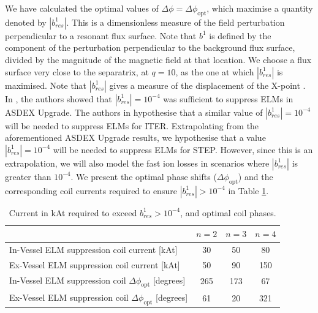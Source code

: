 \documentclass[10pt, a4paper, twoside]{article}
\begin{document}
We have calculated the optimal values of $\Delta \phi = \Delta\phi_\text{opt}$, which maximise a quantity denoted by $|b^1_{res}|$. This is a dimensionless measure of the field perturbation perpendicular to a resonant flux surface. 
Note that $b^1$ is defined by the component of the perturbation perpendicular to the background flux surface, divided by the magnitude of the magnetic field at that location.
We choose a flux surface very close to the separatrix, at $q=10$, as the one at which $|b^1_{res}|$ is maximised. 
Note that $|b^1_{res}|$ gives a measure of the displacement of the X-point \cite{ryan2017}. In \cite{suttrop2018}, the authors showed that $|b^1_{res}|=10^{-4}$ was sufficient to suppress ELMs in ASDEX Upgrade. The authors in \cite{liu2015} hypothesise that a similar value of $|b^1_{res}|=10^{-4}$ will be needed to suppress ELMs for ITER. Extrapolating from the aforementioned ASDEX Upgrade results, we hypothesise that a value $|b^1_{res}|=10^{-4}$ will be needed to suppress ELMs for STEP. However, since this is an extrapolation, we will also model the fast ion losses in scenarios where $|b^1_{res}|$ is greater than $10^{-4}$. We present the optimal phase shifts ($\Delta\phi_\text{opt}$) and the corresponding coil currents required to ensure $|b^1_{res}|>10^{-4}$ in Table \ref{table:optimum_currents_and_phases}. 
\begin{table}[htbp]
\centering
\begin{tabular}{lccc}
\hline
 & \( n=2 \) & \( n=3 \) & \( n=4 \) \\
\hline
In-Vessel ELM suppression coil current [kAt] & 30 & 50 & 80 \\
Ex-Vessel ELM suppression coil current [kAt] & 50 & 90 & 150 \\
In-Vessel ELM suppression coil \(\Delta\phi_\text{opt}\) [degrees] & 265 & 173 & 67 \\
Ex-Vessel ELM suppression coil \(\Delta\phi_\text{opt}\) [degrees] & 61 & 20 & 321 \\
\hline
\end{tabular}
\caption{Current in kAt required to exceed \( b^1_{res} > 10^{-4} \), and optimal coil phases.}
\label{table:optimum_currents_and_phases}
\end{table}
\end{document}
